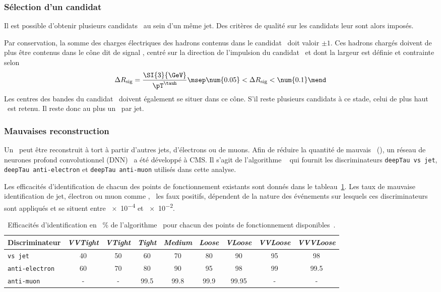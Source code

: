 \subsubsection{Sélection d'un candidat}
Il est possible d'obtenir plusieurs candidats \tauh\ au sein d'un même jet.
Des critères de qualité sur les candidats leur sont alors imposés.
\par
Par conservation, la somme des charges électriques des hadrons contenus dans le candidat \tauh\ doit valoir $\pm1$.
Ces hadrons chargés doivent de plus être contenus dans le cône dit \og de signal \fg{},
centré sur la direction de l'impulsion du candidat \tauh\
et dont la largeur est définie et contrainte selon
\begin{equation}
\Delta R_\text{sig} = \frac{\SI{3}{\GeV}}{\pT^{\tauh}}
\msep
\num{0.05} < \Delta R_\text{sig} < \num{0.1}
\mend
\end{equation}
Les centres des bandes du candidat \tauh\ doivent également se situer dans ce cône.
S'il reste plusieurs candidats à ce stade, celui de plus haut \pT\ est retenu.
Il reste donc au plus un \tauh\ par jet.
\subsubsection{Mauvaises reconstruction}
Un \tauh\ peut être reconstruit à tort à partir d'autres jets, d'électrons ou de muons.
Afin de réduire la quantité de mauvais \tauh\ (\ftauh), un réseau de neurones profond convolutionnel (DNN)~\cite{DNN} a été développé à CMS.
Il s'agit de l'algorithme \DEEPTAU~\cite{CMS-DP-2019-033} qui fournit les discriminateurs
\texttt{deepTau vs jet},
\texttt{deepTau anti-electron} et
\texttt{deepTau anti-muon}
utilisés dans cette analyse.
\par
Les efficacités d'identification de chacun des points de fonctionnement existants sont donnés dans le tableau~\ref{tab-JERC-section-taus-DEEPTAU_eff}.
Les taux de mauvaise identification de jet, électron ou muon comme \tauh, \ie\ les faux positifs, dépendent de la nature des événements sur lesquels ces discriminateurs sont appliqués et se situent entre \num{e-4} et \num{e-2}.
\begin{table}[h]
\centering
\begin{tabular}{lcccccccc}
\toprule
Discriminateur & \emph{VVTight} & \emph{VTight} & \emph{Tight} & \emph{Medium} & \emph{Loose} & \emph{VLoose} & \emph{VVLoose} & \emph{VVVLoose}\\
\midrule
\texttt{vs jet} & \num{40} & \num{50} & \num{60} & \num{70} & \num{80} & \num{90} & \num{95} & \num{98} \\
\texttt{anti-electron} & \num{60} & \num{70} & \num{80} & \num{90} & \num{95} & \num{98} & \num{99} & \num{99.5} \\
\texttt{anti-muon} & - & - & \num{99.5} & \num{99.8} & \num{99.9} & \num{99.95} & - & - \\
\bottomrule
\end{tabular}
\caption[Efficacités d'identification de l'algorithme \DEEPTAU.]{Efficacités d'identification en \SI{}{\%} de l'algorithme \DEEPTAU\ pour chacun des points de fonctionnement disponibles~\cite{CMS-DP-2019-033,Androsov_deeptau}.}
\label{tab-JERC-section-taus-DEEPTAU_eff}
\end{table}